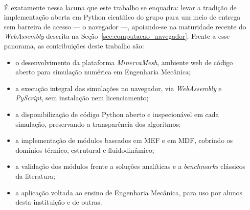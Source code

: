 \paragraph{}É exatamente nessa lacuna que este trabalho se enquadra: levar a tradição de implementação aberta em Python científico do grupo para um meio de entrega sem barreira de acesso --- o navegador ---, apoiando-se na maturidade recente do \textit{WebAssembly} descrita na Seção~\ref{sec:computacao_navegador}. Frente a esse panorama, as contribuições deste trabalho são:
\begin{itemize}
    \item o desenvolvimento da plataforma \textit{MinervaMesh}, ambiente web de código aberto para simulação numérica em Engenharia Mecânica;
    \item a execução integral das simulações no navegador, via \textit{WebAssembly} e \textit{PyScript}, sem instalação nem licenciamento;
    \item a disponibilização de código Python aberto e inspecionável em cada simulação, preservando a transparência dos algoritmos;
    \item a implementação de módulos baseados em MEF e em MDF, cobrindo os domínios térmico, estrutural e fluidodinâmico;
    \item a validação dos módulos frente a soluções analíticas e a \textit{benchmarks} clássicos da literatura;
    \item a aplicação voltada ao ensino de Engenharia Mecânica, para uso por alunos desta instituição e de outras.
\end{itemize}
